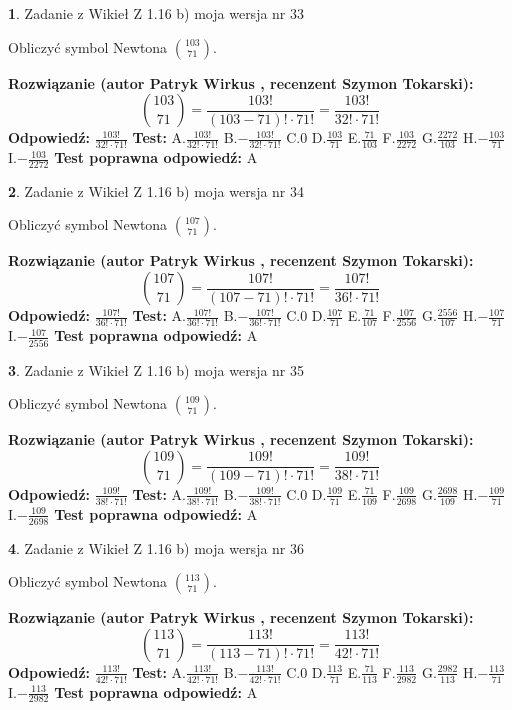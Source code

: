 \documentclass[12pt, a4paper]{article}
\theoremstyle{definition} %
\newtheorem{zad}{}
\newcommand{\zadStart}[1]{\begin{zad}#1\newline}
\newcommand{\zadStop}{\end{zad}}
\newcommand{\rozwStart}[2]{\noindent \textbf{Rozwiązanie (autor #1 , recenzent #2): }\newline}
\newcommand{\rozwStop}{\newline}
\newcommand{\odpStart}{\noindent \textbf{Odpowiedź:}\newline}
\newcommand{\odpStop}{\newline}
\newcommand{\testStart}{\noindent \textbf{Test:}\newline}
\newcommand{\testStop}{\newline}
\newcommand{\kluczStart}{\noindent \textbf{Test poprawna odpowiedź:}\newline}
\newcommand{\kluczStop}{\newline}
\begin{document}
\zadStart{Zadanie z Wikieł Z 1.16 b) moja wersja nr 33}

Obliczyć symbol Newtona ${103 \choose 71}$.
\zadStop
\rozwStart{Patryk Wirkus}{Szymon Tokarski}
$${103 \choose 71} = \frac{103!}{(103-71)! \cdot 71!} = \frac{103!}{32! \cdot 71!}$$
\rozwStop
\odpStart
$\frac{103!}{32! \cdot 71!}$
\odpStop
\testStart
A.$\frac{103!}{32! \cdot 71!}$ B.$-\frac{103!}{32! \cdot 71!}$ C.$0$ D.$\frac{103}{71}$ E.$\frac{71}{103}$
F.$\frac{103}{2272}$ G.$\frac{2272}{103}$
H.$-\frac{103}{71}$
I.$-\frac{103}{2272}$
\testStop
\kluczStart
A
\kluczStop



\zadStart{Zadanie z Wikieł Z 1.16 b) moja wersja nr 34}

Obliczyć symbol Newtona ${107 \choose 71}$.
\zadStop
\rozwStart{Patryk Wirkus}{Szymon Tokarski}
$${107 \choose 71} = \frac{107!}{(107-71)! \cdot 71!} = \frac{107!}{36! \cdot 71!}$$
\rozwStop
\odpStart
$\frac{107!}{36! \cdot 71!}$
\odpStop
\testStart
A.$\frac{107!}{36! \cdot 71!}$ B.$-\frac{107!}{36! \cdot 71!}$ C.$0$ D.$\frac{107}{71}$ E.$\frac{71}{107}$
F.$\frac{107}{2556}$ G.$\frac{2556}{107}$
H.$-\frac{107}{71}$
I.$-\frac{107}{2556}$
\testStop
\kluczStart
A
\kluczStop



\zadStart{Zadanie z Wikieł Z 1.16 b) moja wersja nr 35}

Obliczyć symbol Newtona ${109 \choose 71}$.
\zadStop
\rozwStart{Patryk Wirkus}{Szymon Tokarski}
$${109 \choose 71} = \frac{109!}{(109-71)! \cdot 71!} = \frac{109!}{38! \cdot 71!}$$
\rozwStop
\odpStart
$\frac{109!}{38! \cdot 71!}$
\odpStop
\testStart
A.$\frac{109!}{38! \cdot 71!}$ B.$-\frac{109!}{38! \cdot 71!}$ C.$0$ D.$\frac{109}{71}$ E.$\frac{71}{109}$
F.$\frac{109}{2698}$ G.$\frac{2698}{109}$
H.$-\frac{109}{71}$
I.$-\frac{109}{2698}$
\testStop
\kluczStart
A
\kluczStop



\zadStart{Zadanie z Wikieł Z 1.16 b) moja wersja nr 36}

Obliczyć symbol Newtona ${113 \choose 71}$.
\zadStop
\rozwStart{Patryk Wirkus}{Szymon Tokarski}
$${113 \choose 71} = \frac{113!}{(113-71)! \cdot 71!} = \frac{113!}{42! \cdot 71!}$$
\rozwStop
\odpStart
$\frac{113!}{42! \cdot 71!}$
\odpStop
\testStart
A.$\frac{113!}{42! \cdot 71!}$ B.$-\frac{113!}{42! \cdot 71!}$ C.$0$ D.$\frac{113}{71}$ E.$\frac{71}{113}$
F.$\frac{113}{2982}$ G.$\frac{2982}{113}$
H.$-\frac{113}{71}$
I.$-\frac{113}{2982}$
\testStop
\kluczStart
A
\kluczStop
\end{document}
